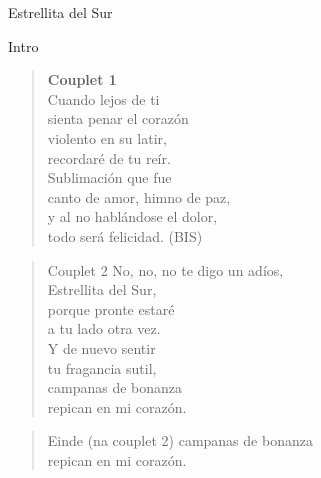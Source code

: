 \begin{song}[vals]{Estrellita del Sur}
\begin{instrumental}{Intro}
\measure{}
\end{instrumental}
\begin{verse}{}
\hspace{-2.5em}\textbf{Couplet 1}\\
Cuando lejos de ti\\
sienta penar el corazón\\
violento en su latir,\\
recordaré de tu reír.\\
Sublimación que fue\\
canto de amor, himno de paz,\\
y al no hablándose el dolor,\\
todo será felicidad. (BIS)\hspace{3em}\\
\end{verse}
\begin{verse}{Couplet 2}
No, no, no te digo un adíos,\hspace{1em}\hspace{7.5em}\\
Estrellita del Sur,\\
porque pronte estaré\\
a tu lado otra vez.\\
\hspace{0.8em}Y de nuevo sentir\\
tu fragancia sutil,\\
campanas de bonanza\\
repican en mi corazón.\\
\end{verse}
\begin{verse}{Einde (na couplet 2)}
campanas de bonanza\\
repican en mi corazón.\hspace{1em}\hspace{2em}\hspace{1.5em}\\
\end{verse}


\end{song}

